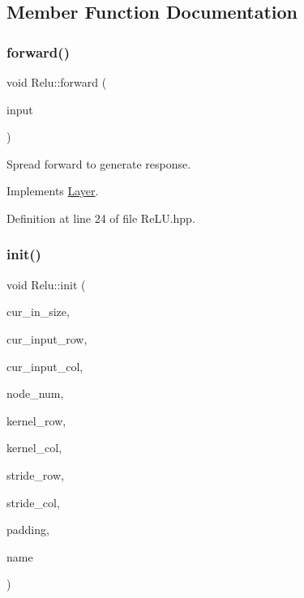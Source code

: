 \subsection{Member Function Documentation}
\mbox{\label{class_relu_affdc902d266350bc024e31836fa2395b}} 
\subsubsection{\texorpdfstring{forward()}{forward()}}
{\footnotesize\ttfamily void Relu\+::forward (\begin{DoxyParamCaption}\item[{std\+::vector$<$ Eigen\+::\+Matrix\+Xd $>$}]{input }\end{DoxyParamCaption})\hspace{0.3cm}{\ttfamily [virtual]}}



Spread forward to generate response. 



Implements \hyperlink{class_layer_ac0b116d692ea457f8e7c0f79f7159004}{Layer}.



Definition at line 24 of file Re\+L\+U.\+hpp.

\mbox{\label{class_relu_a3efe8891f86dea80500302d7cd9fe605}} 
\subsubsection{\texorpdfstring{init()}{init()}}
{\footnotesize\ttfamily void Relu\+::init (\begin{DoxyParamCaption}\item[{int}]{cur\+\_\+in\+\_\+size,  }\item[{int}]{cur\+\_\+input\+\_\+row,  }\item[{int}]{cur\+\_\+input\+\_\+col,  }\item[{double}]{node\+\_\+num,  }\item[{double}]{kernel\+\_\+row,  }\item[{double}]{kernel\+\_\+col,  }\item[{double}]{stride\+\_\+row,  }\item[{double}]{stride\+\_\+col,  }\item[{std\+::string}]{padding,  }\item[{std\+::string}]{name }\end{DoxyParamCaption})\hspace{0.3cm}{\ttfamily [virtual]}}



